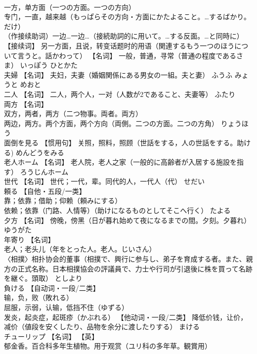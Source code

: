 \documentclass[8pt]{extreport}
\begin{document}
\begin{CJK}{UTF8}{min}
\\	一方，单方面（一つの方面。一つの方向） 
\\	专门，一直，越来越（もっぱらその方向・方面にかたよること。…するばかり。だけ） 
\\	（作接续助词）一边…一边…（接続助詞的に用いて。…する反面。…と同時に） 【接续词】 另一方面，且说，转变话题时的用语（関連するもう一つのほうについて言うと。話かわって） 【名词】 一般，普通，寻常（普通の程度であるさま）	いっぽう ひとかた	
\\	夫婦	【名词】 夫妇，夫妻（婚姻関係にある男女の一組。夫と妻）	ふうふ みょうと めおと	
\\	二人	【名词】 二人，两个人，一对（人数が2であること、夫妻等）	ふたり	
\\	両方	【名词】 
\\	双方，两者，两方（二つ物事。両者。両方） 
\\	两边，两方。两个方面，两个方向（両側。二つの方面。二つの方角）	りょうほう	
\\	面倒を見る	【惯用句】 关照，照料，照顾（世話をする，人の世話をする。助ける)	めんどうをみる	
\\	老人ホーム	【名词】 老人院，老人之家（一般的に高齢者が入居する施設を指す）	ろうじんホーム	
\\	世代	【名词】 世代；一代，辈。同代的人，一代人（代）	せだい	
\\	頼る	【自他・五段/一类】 
\\	靠；依靠；借助；仰赖（頼みにする） 
\\	依赖；依靠（门路、人情等）（助けになるものとしてそこへ行く）	たよる	
\\	夕方	【名词】 傍晚，傍黑（日が暮れ始めて夜になるまでの間。夕刻。夕暮れ）	ゆうがた	
\\	年寄り	【名词】 
\\	老人；老头儿（年をとった人。老人。じいさん） 
\\	〈相撲〉相扑协会的董事（相撲で、興行に参与し、弟子を育成する者。また、親方の正式名称。日本相撲協会の評議員で、力士や行司が引退後に株を買って名跡を継ぐ。頭取）	としより	
\\	負ける	【自动词・一段/二类】 
\\	输，负，败（敗れる） 
\\	屈服，示弱，认输，低挡不住（ゆずる） 
\\	发炎，起炎症，起斑疹（かぶれる） 【他动词・一段/二类】 降低价钱，让价，减价（値段を安くしたり、品物を余分に渡したりする）	まける	
\\	チューリップ	【名词】 【英】
\\	郁金香。百合科多年生植物。用于观赏（ユリ科の多年草。観賞用）		

\end{CJK}
\end{document}
